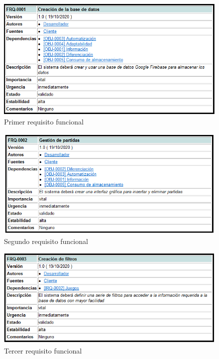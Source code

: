 \begin{figure}[H]
    \centering
    \includegraphics[width=1\linewidth]{fig/Requisitos funcionales/rf1.png}
    \caption{Primer requisito funcional}
    \label{fig:rf1}
\end{figure}
\begin{figure}[H]
    \centering
    \includegraphics[width=1\linewidth]{fig/Requisitos funcionales/rf2.png}
    \caption{Segundo requisito funcional}
    \label{fig:rf2}
\end{figure}
\begin{figure}[H]
    \centering
    \includegraphics[width=1\linewidth]{fig/Requisitos funcionales/rf3.png}
    \caption{Tercer requisito funcional}
    \label{fig:rf3}
\end{figure}
